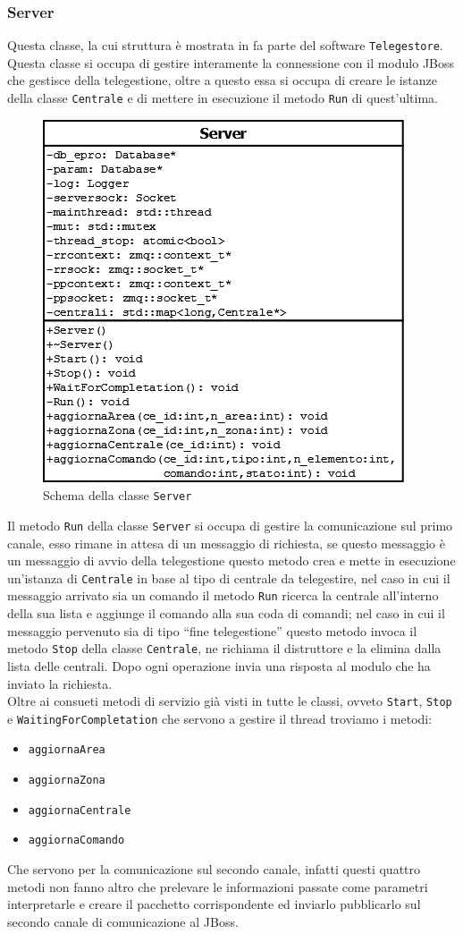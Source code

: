 \subsubsection{Server}
Questa classe, la cui struttura è mostrata in  fa parte del software \texttt{Telegestore}. Questa classe si occupa di gestire interamente la connessione con il modulo JBoss che gestisce della telegestione, oltre a questo essa si occupa di creare le istanze della classe \texttt{Centrale} e di mettere in esecuzione il metodo \texttt{Run} di quest'ultima.
\begin{figure}
	\centering
	\includegraphics[width=0.5\linewidth]{pictures/serverclass.png}
	\caption{Schema della classe \texttt{Server}}\label{fig:serverclass}
\end{figure}
Il metodo \texttt{Run} della classe \texttt{Server} si occupa di gestire la comunicazione sul primo canale, esso rimane in attesa di un messaggio di richiesta, se questo messaggio è un messaggio di avvio della telegestione questo metodo crea e mette in esecuzione un'istanza di \texttt{Centrale} in base al tipo di centrale da telegestire, nel caso in cui il messaggio arrivato sia un comando il metodo \texttt{Run} ricerca la centrale all'interno della sua lista e aggiunge il comando alla sua coda di comandi; nel caso in cui il messaggio pervenuto sia di tipo “fine telegestione” questo metodo invoca il metodo \texttt{Stop} della classe \texttt{Centrale}, ne richiama il distruttore e la elimina dalla lista delle centrali. Dopo ogni operazione invia una risposta al modulo che ha inviato la richiesta.\\
Oltre ai consueti metodi di servizio già visti in tutte le classi, ovveto \texttt{Start}, \texttt{Stop} e \texttt{WaitingForCompletation} che servono a gestire il thread troviamo i metodi:
\begin{itemize}
	\item \texttt{aggiornaArea}
	\item \texttt{aggiornaZona}
	\item \texttt{aggiornaCentrale}
	\item \texttt{aggiornaComando}
\end{itemize}
Che servono per la comunicazione sul secondo canale, infatti questi quattro metodi non fanno altro che prelevare le informazioni passate come parametri interpretarle e creare il pacchetto corrispondente ed inviarlo pubblicarlo sul secondo canale di comunicazione al JBoss.
